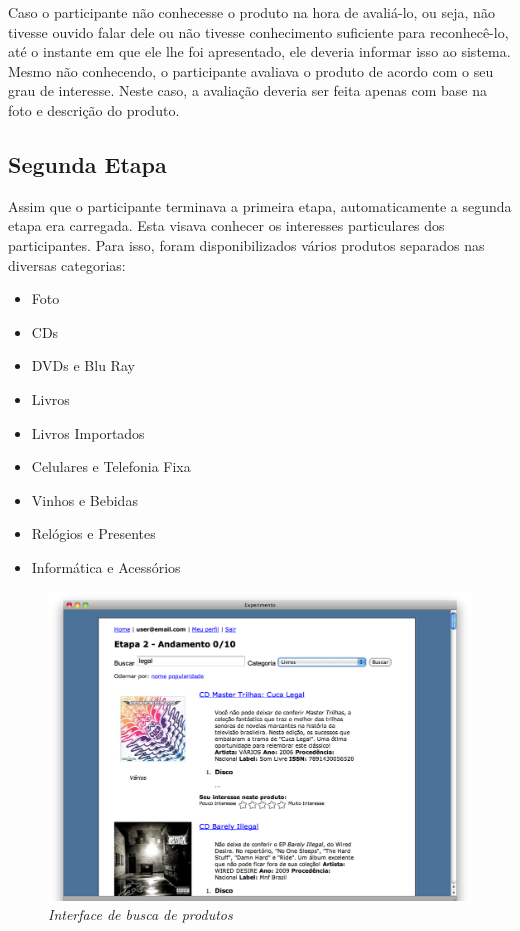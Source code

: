 Caso o participante não conhecesse o produto na hora de avaliá-lo, ou seja, não tivesse ouvido falar dele ou não tivesse conhecimento suficiente para reconhecê-lo, até o instante em que ele lhe foi apresentado, ele deveria informar isso ao sistema. Mesmo não conhecendo, o participante avaliava o produto de acordo com o seu grau de interesse. Neste caso, a avaliação deveria ser feita apenas com base na foto e descrição do produto.

\subsection{Segunda Etapa}
\label{cha:segunda_etapa}

Assim que o participante terminava a primeira etapa, automaticamente a segunda etapa era carregada. Esta visava conhecer os interesses particulares dos participantes. Para isso, foram disponibilizados vários produtos separados nas diversas categorias:

\begin{itemize}
  \item Foto
  \item CDs
  \item DVDs e Blu Ray
  \item Livros
  \item Livros Importados
  \item Celulares e Telefonia Fixa
  \item Vinhos e Bebidas
  \item Relógios e Presentes
  \item Informática e Acessórios
\end{itemize}

\begin{figure}
  \centering
  \includegraphics[width=\textwidth]{imagens/search}
  \caption{\it Interface de busca de produtos}
  \label{fig:product-search}
\end{figure}

